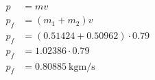 \documentclass{standalone}
\begin{document}
    \(\begin{aligned}
        p &= m v\\
        p_f &= (m_1 + m_2) v\\
        p_f &= (0.51424 + 0.50962)\cdot 0.79\\
        p_f &= 1.02386 \cdot 0.79\\
        p_f &= \SI{0.80885}{\kilo\gram\metre\per\second}
    \end{aligned}\)\\
\end{document}
